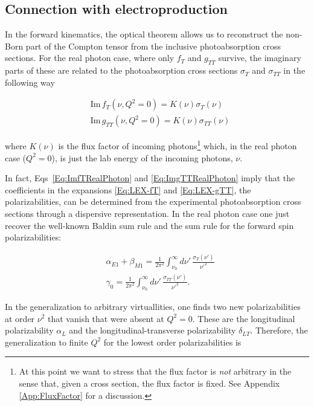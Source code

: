 \documentclass[prc,twocolumn,showpacs,preprintnumbers,amsmath,amssymb
,superscriptaddress,a4paper,nofootinbib
]{revtex4-1}
\begin{document}
\subsection{Connection with electroproduction}
\label{Sec:ConnectionWithElectroproduction}

In the forward kinematics, the optical theorem allows us to reconstruct the non-Born part of the Compton tensor from the inclusive photoabsorption cross sections. 
For the real photon case, where only $f_T$ and $g_{TT}$ survive, the imaginary parts of these are related to the photoabsorption cross sections $\sigma_T$ and $\sigma_{TT}$ in the following way

\begin{align}
&\text{Im}\, f_T(\nu, Q^2=0)= K(\nu) \sigma_T(\nu) \label{Eq:ImfTRealPhoton}\\
&\text{Im}\,  g_{TT}(\nu, Q^2=0)=K(\nu) \sigma_{TT}(\nu)\label{Eq:ImgTTRealPhoton}
\end{align}
  
 where $K(\nu)$ is the flux factor of incoming photons\footnote{At this point we want to stress that the flux factor is {\itshape not} arbitrary in the sense that, given a cross section, the flux factor is fixed. See Appendix \ref{App:FluxFactor} for a discussion.} which, in the real photon case ($Q^2=0$), is just the lab energy of the incoming photons, $\nu$. 
 
In fact, Eqs~\eqref{Eq:ImfTRealPhoton} and \eqref{Eq:ImgTTRealPhoton} imply that the coefficients in the expansions \eqref{Eq:LEX-fT} and \eqref{Eq:LEX-gTT}, the polarizabilities, can be determined from the experimental photoabsorption cross sections through a dispersive representation.
In the real photon case one just recover the well-known Baldin sum rule and the sum rule for the forward spin polarizabilities:
 
\begin{align}
&\alpha_{E1}+\beta_{M1}= \frac{1}{2 \pi^2} \int_{\nu_0}^\infty\!\!\!\! d\nu'\, \frac{\sigma_T (\nu')}{\nu'^2}\\
&\gamma_0= \frac{1}{2 \pi^2} \int_{\nu_0}^\infty\!\!\!\! d\nu'\, \frac{\sigma_{TT} (\nu')}{\nu'^3}.
\end{align}


In the generalization to arbitrary virtuallities, one finds two new polarizabilities at order $\nu^2$ that vanish that were absent at $Q^2=0$.
These are the longitudinal polarizability $\alpha_L$ and the longitudinal-transverse polarizability $\delta_{LT}$. 
Therefore, the generalization to finite $Q^2$ for the lowest order polarizabilities is
\end{document}
